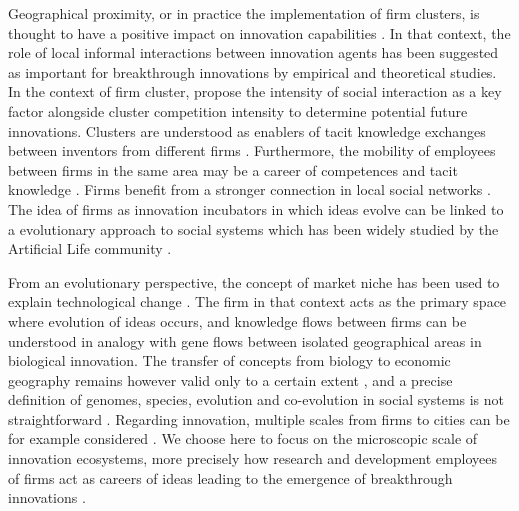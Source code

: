 \documentclass[letterpaper]{article}
\begin{document}
Geographical proximity, or in practice the implementation of firm clusters, is thought to have a positive impact on innovation capabilities \citep{bittencourt2019cluster}. In that context, the role of local informal interactions between innovation agents has been suggested as important for breakthrough innovations by empirical and theoretical studies. In the context of firm cluster, \cite{gnyawali2013complementary} propose the intensity of social interaction as a key factor alongside cluster competition intensity to determine potential future innovations. Clusters are understood as enablers of tacit knowledge exchanges between inventors from different firms \citep{arikan2009interfirm}. Furthermore, the mobility of employees between firms in the same area may be a career of competences and tacit knowledge \citep{almeida1999localization}. Firms benefit from a stronger connection in local social networks \citep{kemeny2016economic}. The idea of firms as innovation incubators in which ideas evolve can be linked to a evolutionary approach to social systems which has been widely studied by the Artificial Life community \citep{marriott2018social}.

From an evolutionary perspective, the concept of market niche has been used to explain technological change \citep{schot2007niches}. The firm in that context acts as the primary space where evolution of ideas occurs, and knowledge flows between firms can be understood in analogy with gene flows between isolated geographical areas in biological innovation. The transfer of concepts from biology to economic geography remains however valid only to a certain extent \citep{schamp2010notion}, and a precise definition of genomes, species, evolution and co-evolution in social systems is not straightforward \citep{raimbault2019modeling}. Regarding innovation, multiple scales from firms to cities can be for example considered \citep{raimbault2020model}. We choose here to focus on the microscopic scale of innovation ecosystems, more precisely how research and development employees of firms act as careers of ideas leading to the emergence of breakthrough innovations \citep{song2016innovation}.
\end{document}
